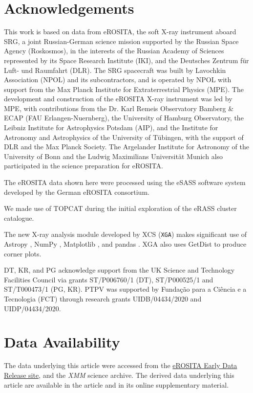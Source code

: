 \documentclass[fleqn,usenatbib]{mnras}
\begin{document}
\section*{Acknowledgements}
This work is based on data from eROSITA, the soft X-ray instrument aboard SRG, a joint Russian-German science mission supported by the Russian Space Agency (Roskosmos), in the interests of the Russian Academy of Sciences represented by its Space Research Institute (IKI), and the Deutsches Zentrum für Luft- und Raumfahrt (DLR). The SRG spacecraft was built by Lavochkin Association (NPOL) and its subcontractors, and is operated by NPOL with support from the Max Planck Institute for Extraterrestrial Physics (MPE). The development and construction of the eROSITA X-ray instrument was led by MPE, with contributions from the Dr. Karl Remeis Observatory Bamberg \& ECAP (FAU Erlangen-Nuernberg), the University of Hamburg Observatory, the Leibniz Institute for Astrophysics Potsdam (AIP), and the Institute for Astronomy and Astrophysics of the University of Tübingen, with the support of DLR and the Max Planck Society. The Argelander Institute for Astronomy of the University of Bonn and the Ludwig Maximilians Universität Munich also participated in the science preparation for eROSITA.

The eROSITA data shown here were processed using the eSASS software system developed by the German eROSITA consortium.

We made use of TOPCAT \citep[][]{topcat} during the initial exploration of the eRASS cluster catalogue.

The new X-ray analysis module developed by XCS (\texttt{XGA}) makes significant use of Astropy \citep[][]{astropy1, astropy2}, NumPy \citep[][]{numpy}, Matplotlib \citep[][]{matplotlib}, and pandas \citep[][]{pandassoftware,pandaspaper}. XGA also uses GetDist \citep[][]{getdist} to produce corner plots.

DT, KR, and PG acknowledge support from the UK Science and Technology Facilities Council via grants ST/P006760/1 (DT),  ST/P000525/1 and ST/T000473/1 (PG, KR). PTPV was supported by Fundação para a Ciência e a Tecnologia (FCT) through research grants UIDB/04434/2020 and UIDP/04434/2020.
\section*{Data Availability}

The data underlying this article were accessed from the \href{https://erosita.mpe.mpg.de/edr/eROSITAObservations/Catalogues/}{eROSITA Early Data Release site}, and the {\em XMM} science archive. The derived data underlying this article are available in the article and in its online supplementary material.
\end{document}

